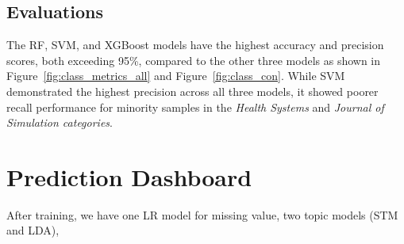 \documentclass[9pt,twocolumn,twoside]{pnas-new}
\begin{document}
\subsection*{Evaluations}

The RF, SVM, and XGBoost models have the highest accuracy and precision scores, both exceeding 95\%, compared to the other three models as shown in Figure~\ref{fig:class_metrics_all} and Figure~\ref{fig:class_con}. While SVM demonstrated the highest precision across all three models, it showed poorer recall performance for minority samples in the \textit{Health Systems} and \textit{Journal of Simulation categories}.


\section{Prediction Dashboard}

After training, we have one LR model for missing value, two topic models (STM and LDA), 





\showacknow %


\end{document}
